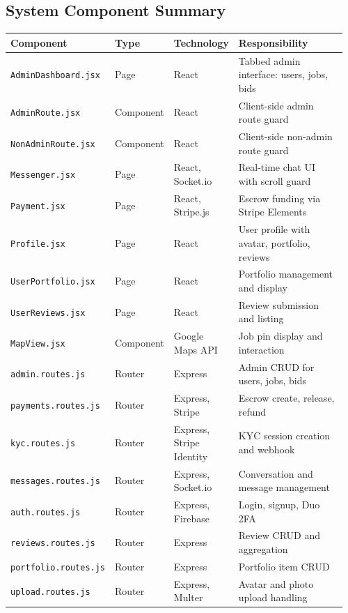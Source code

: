 \documentclass[11pt]{article}
\begin{document}
\subsection{System Component Summary}

\begin{longtable}{@{}p{0.28\linewidth} p{0.12\linewidth} p{0.18\linewidth} p{0.38\linewidth}@{}}
\toprule
\textbf{Component} & \textbf{Type} & \textbf{Technology} & \textbf{Responsibility} \\
\midrule
\endhead
\texttt{AdminDashboard.jsx} & Page & React & Tabbed admin interface: users, jobs, bids \\
\texttt{AdminRoute.jsx} & Component & React & Client-side admin route guard \\
\texttt{NonAdminRoute.jsx} & Component & React & Client-side non-admin route guard \\
\texttt{Messenger.jsx} & Page & React, Socket.io & Real-time chat UI with scroll guard \\
\texttt{Payment.jsx} & Page & React, Stripe.js & Escrow funding via Stripe Elements \\
\texttt{Profile.jsx} & Page & React & User profile with avatar, portfolio, reviews \\
\texttt{UserPortfolio.jsx} & Page & React & Portfolio management and display \\
\texttt{UserReviews.jsx} & Page & React & Review submission and listing \\
\texttt{MapView.jsx} & Component & Google Maps API & Job pin display and interaction \\
\texttt{admin.routes.js} & Router & Express & Admin CRUD for users, jobs, bids \\
\texttt{payments.routes.js} & Router & Express, Stripe & Escrow create, release, refund \\
\texttt{kyc.routes.js} & Router & Express, Stripe Identity & KYC session creation and webhook \\
\texttt{messages.routes.js} & Router & Express, Socket.io & Conversation and message management \\
\texttt{auth.routes.js} & Router & Express, Firebase & Login, signup, Duo 2FA \\
\texttt{reviews.routes.js} & Router & Express & Review CRUD and aggregation \\
\texttt{portfolio.routes.js} & Router & Express & Portfolio item CRUD \\
\texttt{upload.routes.js} & Router & Express, Multer & Avatar and photo upload handling \\

\end{longtable}
\end{document}
